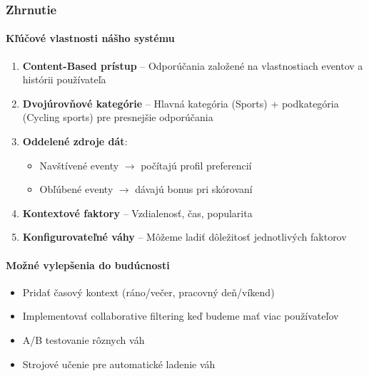 \subsubsection{Zhrnutie}

\paragraph{Kľúčové vlastnosti nášho systému}

\begin{enumerate}
    \item \textbf{Content-Based prístup} -- Odporúčania založené na vlastnostiach eventov a histórii používateľa

    \item \textbf{Dvojúrovňové kategórie} -- Hlavná kategória (Sports) + podkategória (Cycling sports) pre presnejšie odporúčania

    \item \textbf{Oddelené zdroje dát}:
    \begin{itemize}
        \item Navštívené eventy $\rightarrow$ počítajú profil preferencií
        \item Obľúbené eventy $\rightarrow$ dávajú bonus pri skórovaní
    \end{itemize}

    \item \textbf{Kontextové faktory} -- Vzdialenosť, čas, popularita

    \item \textbf{Konfigurovateľné váhy} -- Môžeme ladiť dôležitosť jednotlivých faktorov
\end{enumerate}

\paragraph{Možné vylepšenia do budúcnosti}

\begin{itemize}
    \item Pridať časový kontext (ráno/večer, pracovný deň/víkend)
    \item Implementovať collaborative filtering keď budeme mať viac používateľov
    \item A/B testovanie rôznych váh
    \item Strojové učenie pre automatické ladenie váh
\end{itemize}
